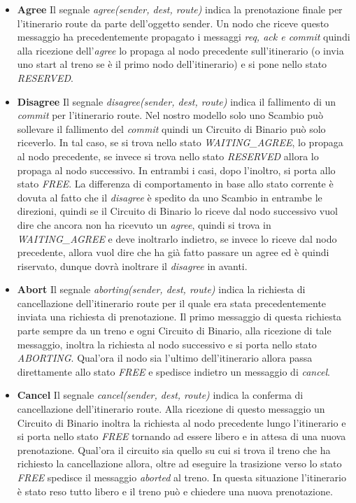 \begin{itemize}
\item \textbf{Agree} Il segnale \textit{agree(sender, dest, route)} indica la
prenotazione finale per l’itinerario route da parte dell’oggetto sender. Un nodo che riceve questo messaggio
ha precedentemente propagato i messaggi \textit{req, ack e commit} quindi alla
ricezione dell’\textit{agree} lo propaga al nodo precedente sull’itinerario (o
invia uno start al treno se è il primo nodo dell’itinerario) e si pone nello
stato \textit{RESERVED}.

\item \textbf{Disagree} Il segnale \textit{disagree(sender, dest, route)} indica il
fallimento di un \textit{commit} per l’itinerario route. Nel nostro modello solo
uno Scambio può sollevare il fallimento del \textit{commit} quindi un Circuito
di Binario può solo riceverlo. In tal caso, se si trova nello stato \textit{WAITING\_AGREE}, lo propaga al nodo precedente, se invece si trova nello stato \textit{RESERVED} allora lo propaga al nodo successivo. In
entrambi i casi, dopo l’inoltro, si porta allo stato \textit{FREE}. La
differenza di comportamento in base allo stato corrente è dovuta al fatto che il
\textit{disagree} è spedito da uno Scambio in entrambe le direzioni, quindi se il Circuito di Binario lo riceve dal nodo successivo vuol dire che ancora non ha ricevuto un \textit{agree}, quindi si trova in
\textit{WAITING\_AGREE} e deve inoltrarlo indietro, se invece lo riceve dal nodo precedente,
allora vuol dire che ha già fatto passare un agree ed è quindi riservato, dunque
dovrà inoltrare il \textit{disagree} in avanti.

\item \textbf{Abort} Il segnale \textit{aborting(sender, dest, route)} indica la
richiesta di cancellazione dell’itinerario route per il quale era stata precedentemente inviata una
richiesta di prenotazione. Il primo messaggio di questa richiesta parte sempre
da un treno e ogni Circuito di Binario, alla ricezione di tale messaggio, inoltra
la richiesta al nodo successivo e si porta nello stato \textit{ABORTING}.
Qual’ora il nodo sia l’ultimo dell’itinerario allora passa direttamente allo
stato \textit{FREE} e spedisce indietro un messaggio di \textit{cancel}.

\item \textbf{Cancel} Il segnale \textit{cancel(sender, dest, route)} indica la
conferma di cancellazione dell’itinerario route. Alla ricezione di questo messaggio un Circuito di Binario
inoltra la richiesta al nodo precedente lungo l’itinerario e si porta nello stato
\textit{FREE} tornando ad essere libero e in attesa di una nuova prenotazione.
Qual’ora il circuito sia quello su cui si trova il treno che ha richiesto la cancellazione allora,
oltre ad eseguire la trasizione verso lo stato \textit{FREE} spedisce il
messaggio \textit{aborted} al treno. In questa situazione l’itinerario è stato
reso tutto libero e il treno può e chiedere una nuova prenotazione.


\end{itemize}
